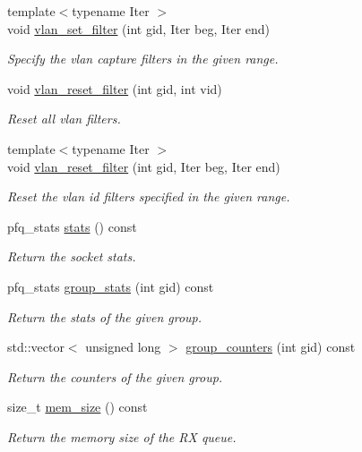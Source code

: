 \begin{DoxyCompactItemize}
{\footnotesize template$<$typename Iter $>$ }\\void \hyperlink{classnet_1_1pfq_a92c3d3dd0a6a194dd0c6f3f8af3b8ffa}{vlan\-\_\-set\-\_\-filter} (int gid, Iter beg, Iter end)
\begin{DoxyCompactList}\small\item\em Specify the vlan capture filters in the given range. \end{DoxyCompactList}\item 
void \hyperlink{classnet_1_1pfq_a97110c0362a20cabdb49e4d2ac5d935d}{vlan\-\_\-reset\-\_\-filter} (int gid, int vid)
\begin{DoxyCompactList}\small\item\em Reset all vlan filters. \end{DoxyCompactList}\item 
{\footnotesize template$<$typename Iter $>$ }\\void \hyperlink{classnet_1_1pfq_ab889e0293649d06ecdc626038fb7af44}{vlan\-\_\-reset\-\_\-filter} (int gid, Iter beg, Iter end)
\begin{DoxyCompactList}\small\item\em Reset the vlan id filters specified in the given range. \end{DoxyCompactList}\item 
pfq\-\_\-stats \hyperlink{classnet_1_1pfq_a4eaca8322c9f3926df19dda2a097fa3c}{stats} () const 
\begin{DoxyCompactList}\small\item\em Return the socket stats. \end{DoxyCompactList}\item 
pfq\-\_\-stats \hyperlink{classnet_1_1pfq_a37f5f1afcffcb6000cce15282fcf8d4b}{group\-\_\-stats} (int gid) const 
\begin{DoxyCompactList}\small\item\em Return the stats of the given group. \end{DoxyCompactList}\item 
std\-::vector$<$ unsigned long $>$ \hyperlink{classnet_1_1pfq_a6bf8419e9e400e8a7ffc9d3a6978cfd8}{group\-\_\-counters} (int gid) const 
\begin{DoxyCompactList}\small\item\em Return the counters of the given group. \end{DoxyCompactList}\item 
size\-\_\-t \hyperlink{classnet_1_1pfq_ac25e20f2b2bfd72ef399444337b76459}{mem\-\_\-size} () const 
\begin{DoxyCompactList}\small\item\em Return the memory size of the R\-X queue. \end{DoxyCompactList}\item 

\end{DoxyCompactItemize}
